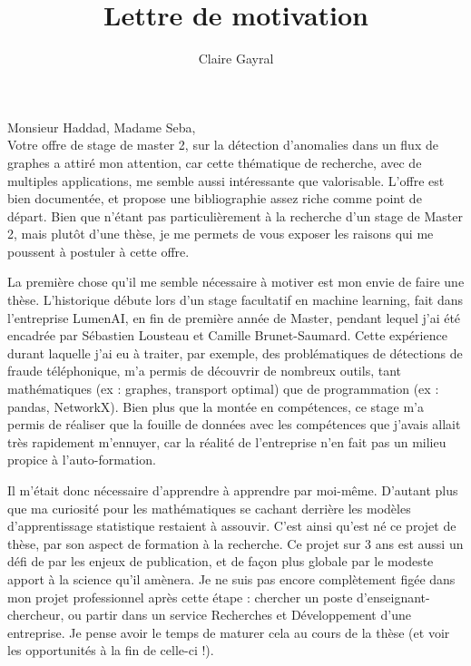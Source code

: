 \documentclass[a4paper,12pt]{article}
\title{Lettre de motivation}
\author{Claire Gayral}
\date{}
\begin{document}
\maketitle

Monsieur Haddad, Madame Seba,\\

Votre offre de stage de master 2, sur la détection d’anomalies dans un flux de graphes a attiré mon attention, car cette thématique de recherche, avec de multiples applications, me semble aussi intéressante que valorisable. L'offre est bien documentée, et propose une bibliographie assez riche comme point de départ. Bien que n'étant pas particulièrement à la recherche d'un stage de Master 2, mais plutôt d'une thèse, je me permets de vous exposer les raisons qui me poussent à postuler à cette offre.%

La première chose qu'il me semble nécessaire à motiver est mon envie de faire une thèse. L'historique débute lors d'un stage facultatif en machine learning, fait dans l'entreprise LumenAI, en fin de première année de Master, pendant lequel j'ai été encadrée par Sébastien Lousteau et Camille Brunet-Saumard. Cette expérience durant laquelle j'ai eu à traiter, par exemple, des problématiques de détections de fraude téléphonique, m'a permis de découvrir de nombreux outils, tant mathématiques (ex : graphes, transport optimal) que de programmation (ex : pandas, NetworkX). Bien plus que la montée en compétences, ce stage m'a permis de réaliser que la fouille de données avec les compétences que j'avais allait très rapidement m'ennuyer, car la réalité de l'entreprise n'en fait pas un milieu propice à l'auto-formation. 

Il m'était donc nécessaire d'apprendre à apprendre par moi-même. D'autant plus que ma curiosité pour les mathématiques se cachant derrière les modèles d'apprentissage statistique restaient à assouvir.
C'est ainsi qu'est né ce projet de thèse, par son aspect de formation à la recherche. 
Ce projet sur 3 ans est aussi un défi de par les enjeux de publication, et de façon plus globale par le modeste apport à la science qu'il amènera. Je ne suis pas encore complètement figée dans mon projet professionnel après cette étape : chercher un poste d'enseignant-chercheur, ou partir dans un service Recherches et Développement d'une entreprise. Je pense avoir le temps de maturer cela au cours de la thèse (et voir les opportunités à la fin de celle-ci !). 
\end{document}
